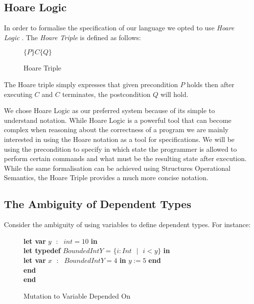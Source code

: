 \documentclass[a4paper,12pt]{report}
\newenvironment{tabs}[1]
 {\flushleft\TabPositions{#1}}
 {\endflushleft}
\begin{document}
\subsection{Hoare Logic}
In order to formalise the specification of our language we opted to use 
\textit{Hoare Logic} \cite{hoare}. The \textit{Hoare Triple} is defined as follows: 

\begin{figure}[H]
  \begin{center}
    $\{P\}C\{Q\}$
  \end{center}
  \caption{Hoare Triple}
\end{figure}
The Hoare triple simply expresses that given precondition $P$ holds then after executing $C$ 
and $C$ terminates, the postcondition $Q$ will hold.

\par
We chose Hoare Logic as our preferred system because of its simple to understand 
notation. While Hoare Logic is a powerful tool that can become complex when 
reasoning about the correctness of a program we are mainly interested in using 
the Hoare notation as a tool for specifications. We will be using the 
precondition to specify in which state the programmer is allowed to perform 
certain commands and what must be the resulting state after execution. While the 
same formalisation can be achieved using Structures Operational Semantics, the 
Hoare Triple provides a much more concise notation. 


\subsection{The Ambiguity of Dependent Types}
Consider the ambiguity of using variables to define dependent types. For 
instance: 

\begin{figure} [H]
  \begin{tabs}{1cm,2cm}
    \textbf{let var }$y\text{ }:\text{ } int = 10$ \textbf{ in } \\
    \tab\textbf{let typedef }$BoundedIntY$ = $\{i : Int\text{ }|\text{ } i < y\}$ \textbf{ in } \\ 
    \tab\tab\textbf{let var }$x\text{ }:\text{ }BoundedIntY = 4$ \textbf{ in }$y := 5$\textbf { end} \\
    \tab\textbf {end} \\
    \textbf{end}
  \end{tabs}  
  \caption{Mutation to Variable Depended On}
\end{figure}
\end{document}
